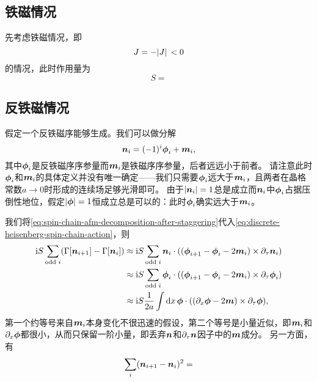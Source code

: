 \subsection{铁磁情况}

先考虑铁磁情况，即
\begin{equation}
    J = - \abs*{J} < 0
\end{equation}
的情况，此时作用量为
\begin{equation}
    S = 
\end{equation}

\subsection{反铁磁情况}

假定一个反铁磁序能够生成。我们可以做分解
\begin{equation}
    \vb*{n}_i = (-1)^i \vb*{\phi}_i + \vb*{m}_i,
\end{equation}
其中$\vb*{\phi}_i$是反铁磁序序参量而$\vb*{m}_i$是铁磁序序参量，后者远远小于前者。
请注意此时$\vb*{\phi}_i$和$\vb*{m}_i$的具体定义并没有唯一确定——我们只需要$\vb*{\phi}_i$远大于$\vb*{m}_i$，且两者在晶格常数$a \to 0$时形成的连续场足够光滑即可。
由于$\abs{\vb*{n}_i} = 1$总是成立而$\vb*{n}_i$中$\vb*{\phi}_i$占据压倒性地位，假定$\abs{\vb*{\phi}} = 1$恒成立总是可以的：此时$\vb*{\phi}_i$确实远大于$\vb*{m}_i$。

我们将\eqref{eq:spin-chain-afm-decomposition-after-staggering}代入\eqref{eq:discrete-heisenberg-spin-chain-action}，则
\[
    \begin{aligned}
        \mathrm{i} S \sum_\text{odd $i$} (\Gamma[\vb*{n}_{i+1}] - \Gamma[\vb*{n}_i]) &\approx \mathrm{i} S \sum_\text{odd $i$} \vb*{n}_i \cdot ((\vb*{\phi}_{i+1} - \vb*{\phi}_i - 2 \vb*{m}_i) \times \partial_\tau \vb*{n}_i) \\
        &\approx \mathrm{i} S \sum_\text{odd $i$} \vb*{\phi}_i \cdot ((\vb*{\phi}_{i+1} - \vb*{\phi}_i - 2 \vb*{m}_i) \times \partial_\tau \vb*{\phi}_i) \\
        &\approx \mathrm{i} S \frac{1}{2a} \int \dd{x} \vb*{\phi} \cdot ((\partial_x \vb*{\phi} - 2 \vb*{m}) \times \partial_\tau \vb*{\phi}),
    \end{aligned}
\]
第一个约等号来自$\vb*{m}_i$本身变化不很迅速的假设，第二个等号是小量近似，即$\vb*{m}_i$和$\partial_x \vb*{\phi}$都很小，从而只保留一阶小量，即丢弃$\vb*{n}$和$\partial_\tau \vb*{n}$因子中的$\vb*{m}$成分。
另一方面，有
\[
    \sum_i (\vb*{n}_{i+1} - \vb*{n}_i)^2 = 
\]

